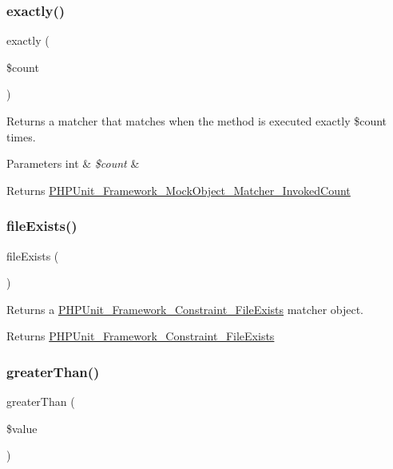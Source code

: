 \subsubsection{\texorpdfstring{exactly()}{exactly()}}
{\footnotesize\ttfamily exactly (\begin{DoxyParamCaption}\item[{}]{\$count }\end{DoxyParamCaption})}

Returns a matcher that matches when the method is executed exactly \$count times.


\begin{DoxyParams}[1]{Parameters}
int & {\em \$count} & \\
\hline
\end{DoxyParams}
\begin{DoxyReturn}{Returns}
\mbox{\hyperlink{class_p_h_p_unit___framework___mock_object___matcher___invoked_count}{P\+H\+P\+Unit\+\_\+\+Framework\+\_\+\+Mock\+Object\+\_\+\+Matcher\+\_\+\+Invoked\+Count}} 
\end{DoxyReturn}
\mbox{\label{_functions_8php_a7e44544f8ebf95b39ff8530b0fc3f2ea}} 
\subsubsection{\texorpdfstring{file\+Exists()}{fileExists()}}
{\footnotesize\ttfamily file\+Exists (\begin{DoxyParamCaption}{ }\end{DoxyParamCaption})}

Returns a \mbox{\hyperlink{class_p_h_p_unit___framework___constraint___file_exists}{P\+H\+P\+Unit\+\_\+\+Framework\+\_\+\+Constraint\+\_\+\+File\+Exists}} matcher object.

\begin{DoxyReturn}{Returns}
\mbox{\hyperlink{class_p_h_p_unit___framework___constraint___file_exists}{P\+H\+P\+Unit\+\_\+\+Framework\+\_\+\+Constraint\+\_\+\+File\+Exists}} 
\end{DoxyReturn}
\mbox{\label{_functions_8php_abce6d1e7cbce97c9725bbbcba61afb3a}} 
\subsubsection{\texorpdfstring{greater\+Than()}{greaterThan()}}
{\footnotesize\ttfamily greater\+Than (\begin{DoxyParamCaption}\item[{}]{\$value }\end{DoxyParamCaption})}

